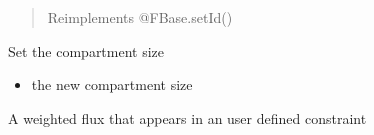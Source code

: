\documentclass[letterpaper,10pt,english]{sphinxmanual}
\begin{document}
\begin{fulllineitems}
\begin{fulllineitems}
\begin{quote}
\begin{itemize}
\end{itemize}

\sphinxAtStartPar
Reimplements @FBase.setId()
\end{quote}

\end{fulllineitems}


\begin{fulllineitems}
\label{\detokenize{modules_doc:cbmpy.CBModel.Compartment.setSize}}
\pysigstartsignatures
{}
\pysigstopsignatures
\sphinxAtStartPar
Set the compartment size
\begin{itemize}
\item {} 
\sphinxAtStartPar
{} the new compartment size

\end{itemize}

\end{fulllineitems}


\end{fulllineitems}


\begin{fulllineitems}
\label{\detokenize{modules_doc:cbmpy.CBModel.ConstraintComponent}}
\pysigstartsignatures
{}
\pysigstopsignatures
\sphinxAtStartPar
A weighted flux that appears in an user defined constraint

\end{fulllineitems}

\end{document}
